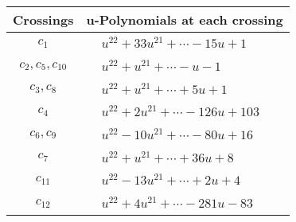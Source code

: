 \documentclass[1p]{elsarticle_modified}
\theoremstyle{definition}
\begin{document}
\begin{tabular}{m{50pt}|m{274pt}}
Crossings & \hspace{64pt}u-Polynomials at each crossing \\
\hline $$\begin{aligned}c_{1}\end{aligned}$$&$\begin{aligned}
&u^{22}+33 u^{21}+\cdots-15 u+1
\end{aligned}$\\
\hline $$\begin{aligned}c_{2},c_{5},c_{10}\end{aligned}$$&$\begin{aligned}
&u^{22}+u^{21}+\cdots- u-1
\end{aligned}$\\
\hline $$\begin{aligned}c_{3},c_{8}\end{aligned}$$&$\begin{aligned}
&u^{22}+u^{21}+\cdots+5 u+1
\end{aligned}$\\
\hline $$\begin{aligned}c_{4}\end{aligned}$$&$\begin{aligned}
&u^{22}+2 u^{21}+\cdots-126 u+103
\end{aligned}$\\
\hline $$\begin{aligned}c_{6},c_{9}\end{aligned}$$&$\begin{aligned}
&u^{22}-10 u^{21}+\cdots-80 u+16
\end{aligned}$\\
\hline $$\begin{aligned}c_{7}\end{aligned}$$&$\begin{aligned}
&u^{22}+u^{21}+\cdots+36 u+8
\end{aligned}$\\
\hline $$\begin{aligned}c_{11}\end{aligned}$$&$\begin{aligned}
&u^{22}-13 u^{21}+\cdots+2 u+4
\end{aligned}$\\
\hline $$\begin{aligned}c_{12}\end{aligned}$$&$\begin{aligned}
&u^{22}+4 u^{21}+\cdots-281 u-83
\end{aligned}$\\
\hline
\end{tabular}\\~\\
\end{document}

